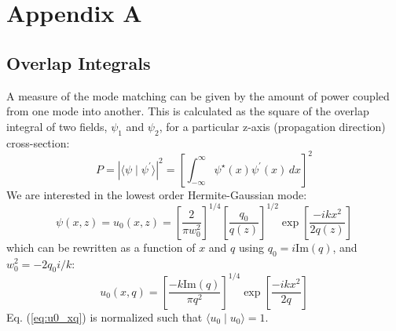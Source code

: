 \chapter{Appendix A}



\section{Overlap Integrals}
A measure of the mode matching can be given by the amount of power
coupled from one mode into another. This is calculated as the square
of the overlap integral of two fields, $\psi_1$ and $\psi_2$, for a
particular z-axis (propagation direction) cross-section:
\begin{equation}
P = \left| \langle \psi \mid \psi^{\prime} \rangle \right|^2 = \left[\int_{-\infty}^\infty \psi^\star(x) \psi^{\prime}(x) \, dx \right]^2
\end{equation}
We are interested in the lowest order Hermite-Gaussian mode:
\begin{equation}
\psi(x,z) = u_0(x,z) = \left[ \frac{2}{\pi w_0^2} \right]^{1/4} \left[
  \frac{q_0}{q(z)} \right]^{1/2} \exp{\left[ \frac{-i k x^2}{2 q(z)}
  \right] }
\end{equation}
which can be rewritten as a function of $x$ and $q$ using
$q_0=i \mbox{Im}(q)$, and $w_0^2 = -2 q_0 i/k$:
\begin{equation}
u_0(x,q) = \left[ \frac{-k \mbox{Im}(q)}{\pi q^2} \right]^{1/4} \exp{\left[ \frac{-i k x^2}{2 q}
  \right] }
\label{eq:u0_xq}
\end{equation}
Eq. (\ref{eq:u0_xq}) is normalized such that $\langle u_0 \mid u_0
\rangle = 1$.

